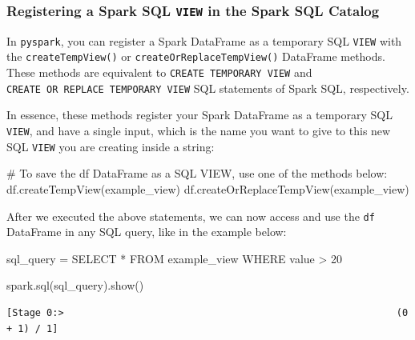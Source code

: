 \documentclass[
  11pt,
  letterpaper,
  DIV=11,
  numbers=noendperiod]{scrreprt}
\newenvironment{Shaded}{\begin{snugshade}}{\end{snugshade}}
\newcommand{\CommentTok}[1]{\textcolor[rgb]{0.37,0.37,0.37}{#1}}
\newcommand{\NormalTok}[1]{\textcolor[rgb]{0.00,0.23,0.31}{#1}}
\newcommand{\OperatorTok}[1]{\textcolor[rgb]{0.37,0.37,0.37}{#1}}
\newcommand{\StringTok}[1]{\textcolor[rgb]{0.13,0.47,0.30}{#1}}
\begin{document}
\hypertarget{registering-a-spark-sql-view-in-the-spark-sql-catalog}{%
\subsubsection{\texorpdfstring{Registering a Spark SQL \texttt{VIEW} in
the Spark SQL
Catalog}{Registering a Spark SQL VIEW in the Spark SQL Catalog}}\label{registering-a-spark-sql-view-in-the-spark-sql-catalog}}

In \texttt{pyspark}, you can register a Spark DataFrame as a temporary
SQL \texttt{VIEW} with the \texttt{createTempView()} or
\texttt{createOrReplaceTempView()} DataFrame methods. These methods are
equivalent to \texttt{CREATE\ TEMPORARY\ VIEW} and
\texttt{CREATE\ OR\ REPLACE\ TEMPORARY\ VIEW} SQL statements of Spark
SQL, respectively.

In essence, these methods register your Spark DataFrame as a temporary
SQL \texttt{VIEW}, and have a single input, which is the name you want
to give to this new SQL \texttt{VIEW} you are creating inside a string:

\begin{Shaded}
\begin{Highlighting}[]
\CommentTok{\# To save the \textasciigrave{}df\textasciigrave{} DataFrame as a SQL VIEW, use one of the methods below:}
\NormalTok{df.createTempView(}\StringTok{\textquotesingle{}example\_view\textquotesingle{}}\NormalTok{)}
\NormalTok{df.createOrReplaceTempView(}\StringTok{\textquotesingle{}example\_view\textquotesingle{}}\NormalTok{)}
\end{Highlighting}
\end{Shaded}

After we executed the above statements, we can now access and use the
\texttt{df} DataFrame in any SQL query, like in the example below:

\begin{Shaded}
\begin{Highlighting}[]
\NormalTok{sql\_query }\OperatorTok{=} \StringTok{\textquotesingle{}\textquotesingle{}\textquotesingle{}}
\StringTok{SELECT *}
\StringTok{FROM example\_view}
\StringTok{WHERE value \textgreater{} 20}
\StringTok{\textquotesingle{}\textquotesingle{}\textquotesingle{}}

\NormalTok{spark.sql(sql\_query).show()}
\end{Highlighting}
\end{Shaded}

\begin{verbatim}
[Stage 0:>                                                          (0 + 1) / 1]
\end{verbatim}
\end{document}
